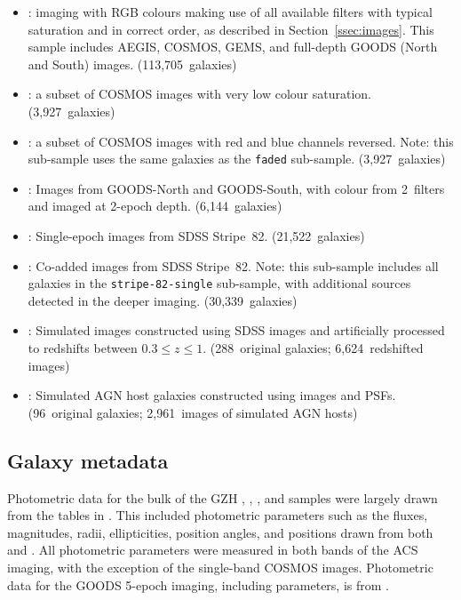 \documentclass[a4paper,fleqn,usenatbib]{mnras}
\begin{document}
\begin{itemize}

\item \main: \hst{} imaging with RGB colours making use of all available
filters with typical saturation and in correct order, as described in
Section~\ref{ssec:images}. This sample includes AEGIS, COSMOS, GEMS, and
full-depth GOODS (North and South) images. (113,705~galaxies)

\item \faded: a subset of COSMOS images with very low colour saturation.
(3,927~galaxies)

\item \recolored: a subset of COSMOS images with red and blue channels
reversed. Note: this sub-sample uses the same galaxies as the \texttt{faded}
sub-sample. (3,927~galaxies)

\item \goods: Images from GOODS-North and GOODS-South, with
colour from 2~filters and imaged at 2-epoch depth. (6,144~galaxies)

\item \stripe: Single-epoch images from SDSS Stripe~82.
(21,522~galaxies)

\item \coadd: Co-added images from SDSS Stripe~82. Note: this
sub-sample includes all galaxies in the \texttt{stripe-82-single} sub-sample,
with additional sources detected in the deeper imaging. (30,339~galaxies)

\item \redshifted: Simulated \hst{} images constructed using SDSS
images and artificially processed to redshifts between $0.3 \leq z \leq 1$.
(288~original galaxies; 6,624~redshifted images)

\item \simagn: Simulated AGN host galaxies constructed using \hst{} images and
PSFs. (96~original galaxies; 2,961~images of simulated AGN hosts)


\end{itemize}


\subsection{Galaxy metadata}

Photometric data for the bulk of the GZH \main, \faded, \recolored, and
\goods{} samples were largely drawn from the tables in \citet{gri12}. This
included photometric parameters such as the fluxes, magnitudes, radii,
ellipticities, position angles, and positions drawn from both \sextractor{} and
\galfit.  All photometric parameters were measured in both bands of the ACS
imaging, with the exception of the single-band COSMOS images. Photometric data
for the GOODS 5-epoch imaging, including \sextractor{} parameters, is from
\citet{gia12}.
\end{document}
